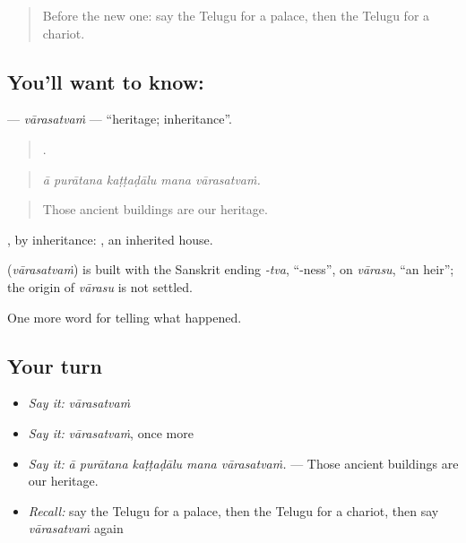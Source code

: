 \label{lesson:TE-C369-varasatvam}



\begin{quote}
Before the new one: say the Telugu for a palace, then the Telugu for a chariot.
\end{quote}

\subsection*{You'll want to know: }
\textbf{} — \emph{vārasatvaṁ} — \textquotedblleft{}heritage; inheritance\textquotedblright{}.

\begin{quote}
    .
\end{quote}

\begin{quote}
\emph{ā purātana kaṭṭaḍālu mana vārasatvaṁ.}
\end{quote}

\begin{quote}
Those ancient buildings are our heritage.
\end{quote}

, by inheritance:   , an inherited house.

\begin{cousinweb}
\textbf{} (\emph{vārasatvaṁ}) is built with the Sanskrit ending \emph{-tva}, \textquotedblleft{}-ness\textquotedblright{}, on \emph{vārasu}, \textquotedblleft{}an heir\textquotedblright{}; the origin of \emph{vārasu} is not settled.
\end{cousinweb}

\begin{grammarlens}[title={What you've built}]
One more word for telling what happened.
\end{grammarlens}

\subsection*{Your turn}
\begin{itemize}
\raggedright
  \item \emph{Say it:} \emph{vārasatvaṁ}
  \item \emph{Say it:} \emph{vārasatvaṁ}, once more
  \item \emph{Say it:} \emph{ā purātana kaṭṭaḍālu mana vārasatvaṁ.} — Those ancient buildings are our heritage.
  \item \emph{Recall:} say the Telugu for a palace, then the Telugu for a chariot, then say \emph{vārasatvaṁ} again
\end{itemize}

